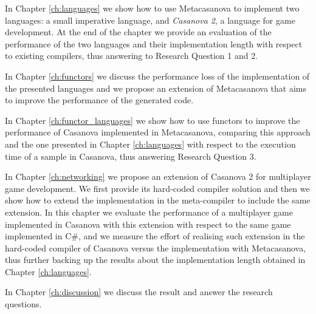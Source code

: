 In Chapter \ref{ch:languages} we show how to use Metacasanova to implement two languages: a small imperative language, and \textit{Casanova 2}, a language for game development. At the end of the chapter we provide an evaluation of the performance of the two languages and their implementation length with respect to existing compilers, thus answering to Research Question 1 and 2.

In Chapter \ref{ch:functors} we discuss the performance loss of the implementation of the presented languages and we propose an extension of Metacasanova that aims to improve the performance of the generated code.

In Chapter \ref{ch:functor_languages} we show how to use functors to improve the performance of Casanova implemented in Metacasanova, comparing this approach and the one presented in Chapter \ref{ch:languages} with respect to the execution time of a sample in Casanova, thus answering Research Question 3.

In Chapter \ref{ch:networking} we propose an extension of Casanova 2 for multiplayer game development. We first provide its hard-coded compiler solution and then we show how to extend the implementation in the meta-compiler to include the same extension. In this chapter we evaluate the performance of a multiplayer game implemented in Casanova with this extension with respect to the same game implemented in C\#, and we measure the effort of realising such extension in the hard-coded compiler of Casanova versus the implementation with Metacasanova, thus further backing up the results about the implementation length obtained in Chapter \ref{ch:languages}.

In Chapter \ref{ch:discussion} we discuss the result and answer the research questions.